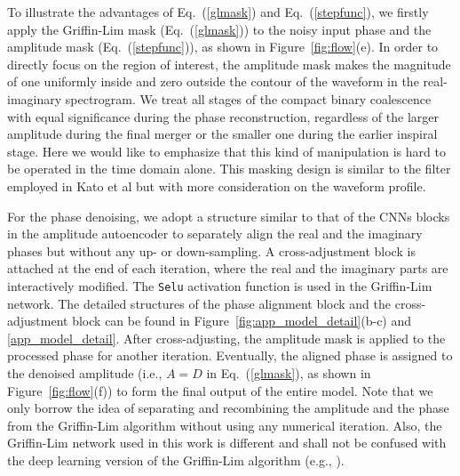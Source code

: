 \documentclass[preprint,12pt]{elsarticle}
\begin{document}
To illustrate the advantages of Eq.~(\ref{glmask}) and Eq.~(\ref{stepfunc}), we firstly apply the Griffin-Lim mask (Eq.~(\ref{glmask})) to the noisy input phase and the amplitude mask (Eq.~(\ref{stepfunc})), as shown in Figure~\ref{fig:flow}(e). 
In order to directly focus on the region of interest, the amplitude mask makes the magnitude of one uniformly inside and zero outside the contour of the waveform in the real-imaginary spectrogram. 
We treat all stages of the compact binary coalescence with equal significance during the phase reconstruction, regardless of the larger amplitude during the final merger or the smaller one during the earlier inspiral stage. 
Here we would like to emphasize that this kind of manipulation is hard to be operated in the time domain alone. 
This masking design is similar to the filter employed in Kato et al \cite{kato2022validation} but with more consideration on the waveform profile.

For the phase denoising, we adopt a structure similar to that of the CNNs blocks in the amplitude autoencoder to separately align the real and the imaginary phases but without any up- or down-sampling.
A cross-adjustment block is attached at the end of each iteration, where the real and the imaginary parts are interactively modified. 
The {\tt Selu} activation function \cite{klambauer2017self} is used in the Griffin-Lim network.
The detailed structures of the phase alignment block and the cross-adjustment block can be found in Figure~\ref{fig:app_model_detail}(b-c) and \ref{app_model_detail}.
After cross-adjusting, the amplitude mask is applied to the processed phase for another iteration. 
Eventually, the aligned phase is assigned to the denoised amplitude (i.e., $A=D$ in Eq.~(\ref{glmask}), as shown in Figure~\ref{fig:flow}(f)) to form the final output of the entire model. 
Note that we only borrow the idea of separating and recombining the amplitude and the phase from the Griffin-Lim algorithm \cite{griffin1984signal} without using any numerical iteration.
Also, the Griffin-Lim network used in this work is different and shall not be confused with the deep learning version of the Griffin-Lim algorithm (e.g., \cite{masuyama2020deep}).
\end{document}
